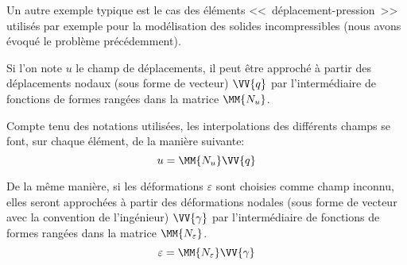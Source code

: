 \medskip
Un autre exemple typique est le cas des éléments <<~déplacement-pression~>>
utilisés par exemple pour la modélisation des solides incompressibles (nous avons
évoqué le problème précédemment).



\bigskip
{}

\medskip
Si l'on note $u$ le champ de déplacements, il peut être approché à partir
des déplacements nodaux (sous forme de vecteur) $\VV{q}$ par l'intermédiaire
de fonctions de formes rangées dans la matrice $\MM{N_u}$.

Compte tenu des notations utilisées, les interpolations des différents
champs se font, sur chaque élément, de la manière suivante:
\begin{equation}
   u=\MM{N_u}\VV{q}
\end{equation}

De la même manière, si les déformations $\varepsilon$ sont choisies comme champ inconnu,
elles seront approchées à partir des déformations nodales (sous forme de vecteur avec
la convention de l'ingénieur) $\VV{\gamma}$ par l'intermédiaire de fonctions de formes rangées
dans la matrice $\MM{N_\varepsilon}$.
\begin{equation}
   \varepsilon = \MM{N_\varepsilon}\VV{\gamma}
\end{equation}

